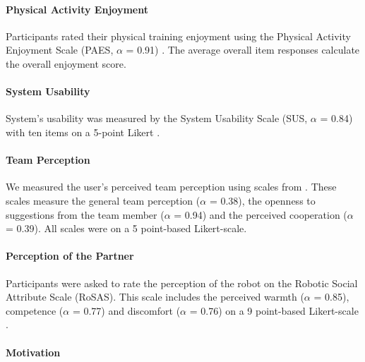 \documentclass[twocolumn]{svjour3}          %
\begin{document}
\hypertarget{physical-activity-enjoyment}{%
\paragraph{Physical Activity
Enjoyment}\label{physical-activity-enjoyment}}

Participants rated their physical training enjoyment using the Physical
Activity Enjoyment Scale (PAES, \(\alpha\) = 0.91)
\autocite{kendzierski1991physical}. The average overall item responses
calculate the overall enjoyment score.

\hypertarget{system-usability}{%
\paragraph{System Usability}\label{system-usability}}

System's usability was measured by the System Usability Scale (SUS,
\(\alpha\) = 0.84) with ten items on a 5-point Likert
\autocite{brooke1996sus}.

\hypertarget{team-perception}{%
\paragraph{Team Perception}\label{team-perception}}

We measured the user's perceived team perception using scales from
\autocite{nass1996can}. These scales measure the general team perception
(\(\alpha\) = 0.38), the openness to suggestions from the team member
(\(\alpha\) = 0.94) and the perceived cooperation (\(\alpha\) = 0.39).
All scales were on a 5 point-based Likert-scale.

\hypertarget{perception-of-the-partner}{%
\paragraph{Perception of the
Partner}\label{perception-of-the-partner}}

Participants were asked to rate the perception of the robot on the
Robotic Social Attribute Scale (RoSAS). This scale includes the
perceived warmth (\(\alpha\) = 0.85), competence (\(\alpha\) = 0.77) and
discomfort (\(\alpha\) = 0.76) on a 9 point-based Likert-scale
\autocite{carpinella2017robotic}.

\hypertarget{motivation}{%
\paragraph{Motivation}\label{motivation}}
\end{document}
